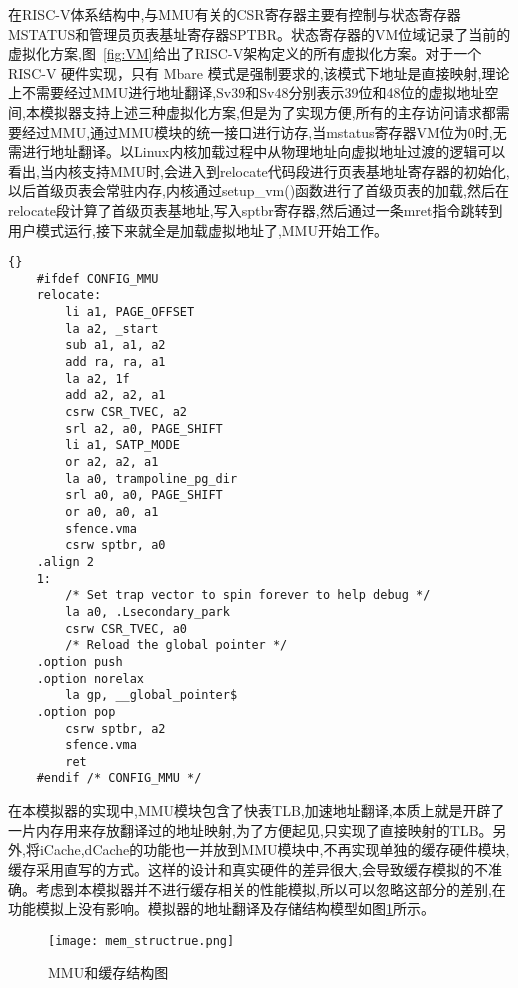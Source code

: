 在RISC-V体系结构中,与MMU有关的CSR寄存器主要有控制与状态寄存器MSTATUS和管理员页表基址寄存器SPTBR。状态寄存器的VM位域记录了当前的虚拟化方案,图~\ref{fig:VM}给出了RISC-V架构定义的所有虚拟化方案。对于一个 RISC-V 硬件实现，只有 Mbare 模式是强制要求的,该模式下地址是直接映射,理论上不需要经过MMU进行地址翻译,Sv39和Sv48分别表示39位和48位的虚拟地址空间,本模拟器支持上述三种虚拟化方案,但是为了实现方便,所有的主存访问请求都需要经过MMU,通过MMU模块的统一接口进行访存,当mstatus寄存器VM位为0时,无需进行地址翻译。以Linux内核加载过程中从物理地址向虚拟地址过渡的逻辑可以看出,当内核支持MMU时,会进入到relocate代码段进行页表基地址寄存器的初始化,以后首级页表会常驻内存,内核通过setup\_vm()函数进行了首级页表的加载,然后在relocate段计算了首级页表基地址,写入sptbr寄存器,然后通过一条mret指令跳转到用户模式运行,接下来就全是加载虚拟地址了,MMU开始工作。
\begin{lstlisting}{}
    #ifdef CONFIG_MMU
    relocate:
        li a1, PAGE_OFFSET
        la a2, _start
        sub a1, a1, a2
        add ra, ra, a1
        la a2, 1f
        add a2, a2, a1
        csrw CSR_TVEC, a2
        srl a2, a0, PAGE_SHIFT
        li a1, SATP_MODE
        or a2, a2, a1
        la a0, trampoline_pg_dir
        srl a0, a0, PAGE_SHIFT
        or a0, a0, a1
        sfence.vma
        csrw sptbr, a0
    .align 2
    1:
        /* Set trap vector to spin forever to help debug */
        la a0, .Lsecondary_park
        csrw CSR_TVEC, a0
        /* Reload the global pointer */
    .option push
    .option norelax
        la gp, __global_pointer$
    .option pop
        csrw sptbr, a2
        sfence.vma
        ret
    #endif /* CONFIG_MMU */    
\end{lstlisting}


在本模拟器的实现中,MMU模块包含了快表TLB,加速地址翻译,本质上就是开辟了一片内存用来存放翻译过的地址映射,为了方便起见,只实现了直接映射的TLB。另外,将iCache,dCache的功能也一并放到MMU模块中,不再实现单独的缓存硬件模块,缓存采用直写的方式。这样的设计和真实硬件的差异很大,会导致缓存模拟的不准确。考虑到本模拟器并不进行缓存相关的性能模拟,所以可以忽略这部分的差别,在功能模拟上没有影响。模拟器的地址翻译及存储结构模型如图\ref{fig:mem_structrue}所示。
\begin{figure}[h]
    \centering
    \texttt{[image: mem\_structrue.png]}
    \caption{MMU和缓存结构图}
    \label{fig:mem_structrue}
\end{figure}


